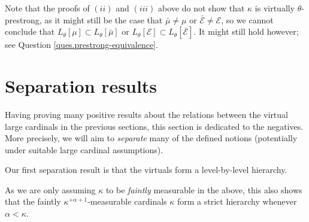 \documentclass[../../main]{subfiles}
\begin{document}
Note that the proofs of $(ii)$ and $(iii)$ above do not show that $\kappa$ is virtually $\theta$-prestrong, as it might still be the case that $\bar\mu\neq\mu$ or $\bar{\mathcal E}\neq\mathcal E$, so we cannot conclude that $L_\theta[\mu]\subset L_\theta[\bar\mu]$ or $L_\theta[\mathcal E]\subset L_\theta[\overline{\mathcal E}]$. It might still hold however; see Question \ref{ques.prestrong-equivalence}.


\section{Separation results}

Having proving many positive results about the relations between the virtual large cardinals in the previous sections, this section is dedicated to the negatives. More precisely, we will aim to \textit{separate} many of the defined notions (potentially under suitable large cardinal assumptions).

\qquad Our first separation result is that the virtuals form a level-by-level hierarchy.


As we are only assuming $\kappa$ to be \textit{faintly} measurable in the above, this also shows that the faintly $\kappa^{+\alpha+1}$-measurable cardinals $\kappa$ form a strict hierarchy whenever $\alpha<\kappa$.
\end{document}
